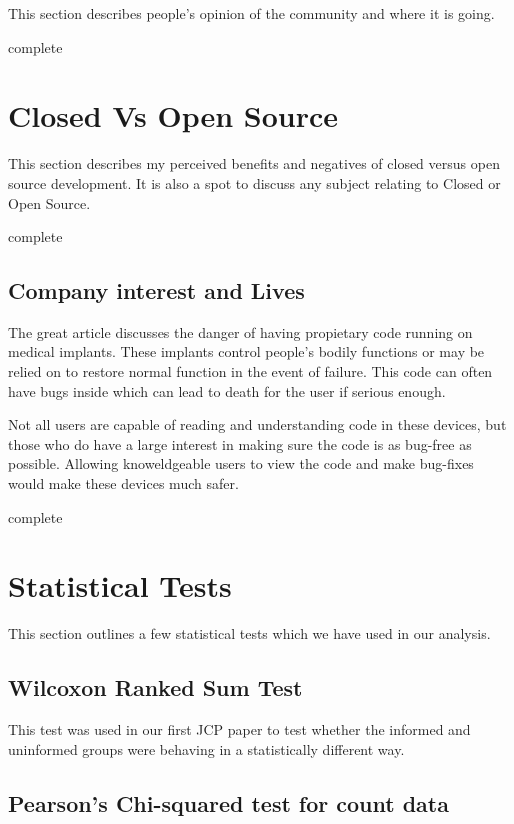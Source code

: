 \documentclass{article}
\newcommand{\complete}{
	\gls{complete}
}
\begin{document}
This section describes people's opinion of the community and where it is going.

\complete

\section{Closed Vs Open Source}

This section describes my perceived benefits and negatives of closed versus open source development. It is also a spot to discuss any subject relating to Closed or Open Source.

\complete

\subsection{Company interest and Lives}

The great article \cite{killed-by-code} discusses the danger of having propietary code running on medical implants. These implants control people's bodily functions or may be relied on to restore normal function in the event of failure. This code can often have bugs inside which can lead to death for the user if serious enough.

Not all users are capable of reading and understanding code in these devices, but those who do have a large interest in making sure the code is as bug-free as possible. Allowing knoweldgeable users to view the code and make bug-fixes would make these devices much safer.

\complete

\section{Statistical Tests}

This section outlines a few statistical tests which we have used in our analysis.

\subsection{Wilcoxon Ranked Sum Test}

This test was used in our first JCP paper to test whether the informed and uninformed groups were behaving in a statistically different way. \cite{doi:10.1080/01621459.1972.10481279,R-wilcoxon-test}

\subsection{Pearson's Chi-squared test for count data}
\end{document}
